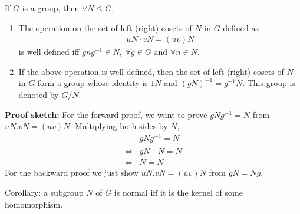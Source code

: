 \documentclass[titlepage, 12pt]{book}
\begin{document}
\begin{proposition}{}{}
    If $G$ is a group, then $\forall N\le G$,
    \begin{enumerate}
        \item The operation on the set of left (right) cosets of $N$ in $G$ defined as
            \begin{gather*}
                uN\cdot vN = (uv)N
            \end{gather*}
            is well defined iff $gng^{-1}\in N,\;\forall g\in G$ and $\forall
            n\in N$.
        \item If the above operation is well defined, then the set of left (right)
            cosets of $N$ in $G$ form a group whose identity is $1N$ and
            $(gN)^{-1} = g^{-1}N$. This group is denoted by $G/N$.
    \end{enumerate}
\end{proposition}
\textbf{Proof sketch:} For the forward proof, we want to prove $gNg^{-1} = N$
from $uN.vN=(uv)N$. Multiplying both sides by $N$,
\begin{align*}
    &gNg^{-1} = N\\
    \iff &gN^{-1}N = N\\
    \iff &N = N
\end{align*}
For the backward proof we just show $uN.vN = (uv)N$ from $gN = Ng$.

Corollary: a subgroup $N$ of $G$ is normal iff it is the kernel of some
homomorphism.
\end{document}
